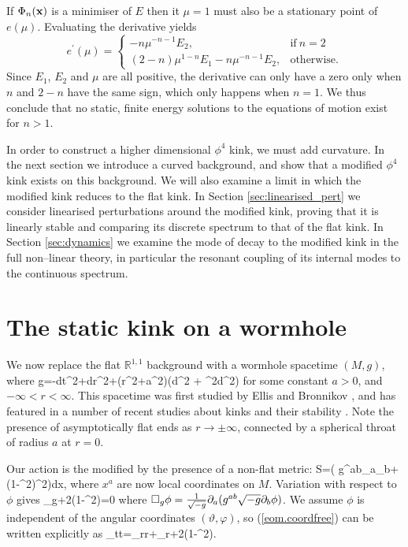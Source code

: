 If $\Phi_n({\bf x})$ is a minimiser of $E$ then it $\mu=1$ must also be a stationary point of $e(\mu)$. Evaluating the derivative yields
\[
e^\prime(\mu)= \begin{cases}
      -n\mu^{-n-1}E_2, & \text{if}\ n=2 \\
      (2-n)\mu^{1-n}E_1 -n\mu^{-n-1}E_2, & \text{otherwise}.
    \end{cases}
\]
Since $E_1$, $E_2$ and $\mu$ are all positive, the derivative can only have a zero only when $n$ and $2-n$ have the same sign, which only happens when $n=1$. We thus conclude that no static, finite energy solutions to the equations of motion exist for $n>1$.

In order to construct a higher dimensional $\phi^4$ kink, we must add curvature. In the next section we introduce a curved background, and show that a modified $\phi^4$ kink exists on this background. We will also examine a limit in which the modified kink reduces to the flat kink. In Section \ref{sec:linearised_pert} we consider linearised perturbations around the modified kink, proving that it is linearly stable and comparing its discrete spectrum to that of the flat kink. In Section \ref{sec:dynamics} we examine the mode of decay to the modified kink in the full non--linear theory, in particular the resonant coupling of its internal modes to the continuous spectrum.

\section{The static kink on a wormhole}

We now replace the flat $\mathbb{R}^{1,1}$ background with a wormhole spacetime $(M,g)$, where
\be
\nonumber
g=-dt^2+dr^2+(r^2+a^2)(d\vartheta^2 + \sin^2\vartheta d\varphi^2)
\ee
for some constant $a>0$, and $-\infty<r<\infty$. This spacetime was first studied by Ellis \cite{Ellis} and Bronnikov \cite{Bronnikov}, and has featured in a number of recent studies about kinks and their stability \cite{wavemaps,SG}. Note the presence of asymptotically flat ends as $r\rightarrow\pm\infty$, connected by a spherical throat of radius $a$ at $r=0$.

Our action is the modified by the presence of a non-flat metric:
\be
\nonumber
S=\int\bigg( g^{ab}\p_a\phi\p_b\phi + (1-\phi^2)^2\bigg)dx,
\ee
where $x^a$ are now local coordinates on $M$. Variation with respect to $\phi$ gives
\be
\label{eom.coordfree}
\square_g\phi+2\phi(1-\phi^2)=0
\ee
where $\square_g\phi=\frac{1}{\sqrt{-g}}\partial_a(g^{ab}\sqrt{-g}\partial_b\phi)$. We assume $\phi$ is independent of the angular coordinates $(\vartheta,\varphi)$, so (\ref{eom.coordfree}) can be written explicitly as
\be
\label{eom.coords}
\phi_{tt}=\phi_{rr}+\phi_r+2\phi(1-\phi^2).
\ee


